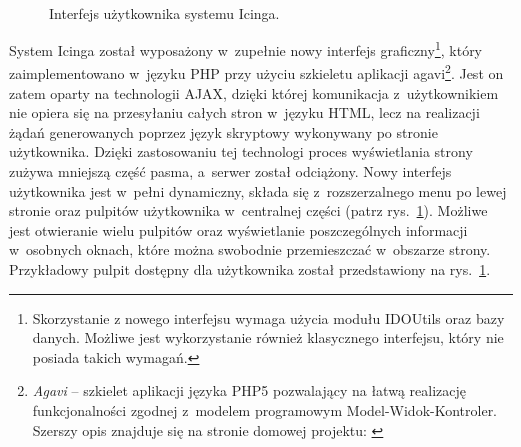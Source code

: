\begin{figure}[ht]
\label{fig:IcingaInterface}
\caption{Interfejs użytkownika systemu Icinga.}
\begin{center}
\\[0.1cm]
\end{center}
\end{figure}

System Icinga został wyposażony w~zupełnie nowy interfejs
graficzny\footnote{Skorzystanie z nowego interfejsu wymaga użycia
  modułu IDOUtils oraz bazy danych. Możliwe jest wykorzystanie również
  klasycznego interfejsu, który nie posiada takich wymagań.}, który
zaimplementowano w~języku PHP przy użyciu szkieletu aplikacji
agavi\footnote{{\em Agavi } -- szkielet aplikacji języka PHP5
  pozwalający na łatwą realizację funkcjonalności zgodnej z~modelem
  programowym Model-Widok-Kontroler. Szerszy opis znajduje się na
  stronie domowej projektu: \cite{www:Agavi}}. Jest on zatem oparty na
technologii AJAX, dzięki której komunikacja z~użytkownikiem nie
opiera się na przesyłaniu całych stron w~języku HTML, lecz na
realizacji żądań generowanych poprzez język skryptowy wykonywany po
stronie użytkownika. Dzięki zastosowaniu tej technologi proces
wyświetlania strony zużywa mniejszą część pasma, a~serwer został
odciążony. Nowy interfejs użytkownika jest w~pełni dynamiczny, składa
się z~rozszerzalnego menu po lewej stronie oraz pulpitów
użytkownika w~centralnej części (patrz
rys.~\ref{fig:IcingaInterface}). Możliwe jest otwieranie wielu
pulpitów oraz wyświetlanie poszczególnych informacji w~osobnych
oknach, które można swobodnie przemieszczać w~obszarze
strony. Przykładowy pulpit dostępny dla użytkownika został
przedstawiony na rys.~\ref{fig:IcingaInterface}.

